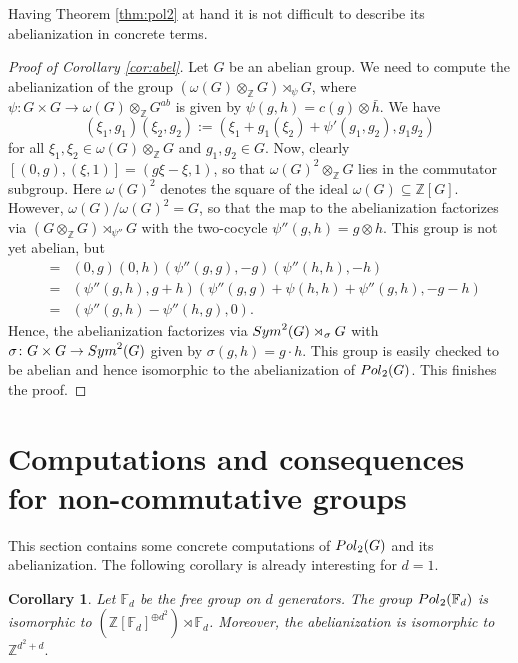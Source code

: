 \documentclass[a4paper,11pt]{amsproc}
\theoremstyle{plain}
\newtheorem{corollary}[theorem]{Corollary}
\theoremstyle{definition}
\begin{document}
Having Theorem \ref{thm:pol2} at hand it is not difficult to describe its abelianization in concrete terms.

\begin{proof}[Proof of Corollary \ref{cor:abel}] Let $G$ be an abelian group.
We need to compute the abelianization of the group $(\omega(G) \otimes_{\mathbb Z} G) \rtimes_{\psi} G$, where $
\psi \colon G \times G \to \omega(G) \otimes_{\mathbb Z} G^{ab}$ is given by $\psi(g,h)=c(g) \otimes \bar h.$ We have
$$(\xi_1,g_1)(\xi_2,g_2) := (\xi_1 + g_1(\xi_2) + \psi'(g_1,g_2),g_1g_2)$$
for all $\xi_1,\xi_2 \in \omega(G) \otimes_{\mathbb Z} G$ and $g_1,g_2 \in G.$ Now, clearly
$[(0,g),(\xi,1)] = (g\xi - \xi,1)$, so that $\omega(G)^2 \otimes_{\mathbb Z} G$ lies in the commutator subgroup. Here $\omega(G)^2$ denotes the square of the ideal $\omega(G) \subseteq \mathbb Z[G]$. However, $\omega(G)/\omega(G)^2 = G$, so that the map to the abelianization factorizes via
$(G \otimes_{\mathbb Z} G) \rtimes_{\psi''} G$ with the two-cocycle $\psi''(g,h)= g \otimes h.$ This group is not yet abelian, but 
\begin{eqnarray*}
[(0,g),(0,h)] &=& (0,g)(0,h)(\psi''(g,g),-g)(\psi''(h,h),-h)\\
&=& (\psi''(g,h),g+h)(\psi''(g,g)+\psi(h,h)+ \psi''(g,h),-g-h) \\
&=& (\psi''(g,h) - \psi''(h,g),0).
\end{eqnarray*}
Hence, the abelianization factorizes via ${\rm Sym}^2(G) \rtimes_{\sigma} G$ with $\sigma \colon G \times G \to {\rm Sym}^2(G)$ given by $\sigma(g,h)=g \cdot h.$ This group is easily checked to be abelian and hence isomorphic to the abelianization of ${\rm Pol}_2(G)$. This finishes the proof.
\end{proof}



\section{Computations and consequences for non-commutative groups}\label{sec4}
\label{sec:cons}

This section contains some concrete computations of ${\rm Pol}_2(G)$ and its abelianization. The following corollary is already interesting for $d=1.$

\begin{corollary} \label{cor:free}
Let $\mathbb F_d$ be the free group on $d$ generators. The group ${\rm Pol}_2(\mathbb F_d)$ is isomorphic to
$(\mathbb Z[\mathbb F_d]^{\oplus d^2}) \rtimes \mathbb F_d$. Moreover, the abelianization is isomorphic to $\mathbb Z^{d^2+d}.$
\end{corollary}
\end{document}

